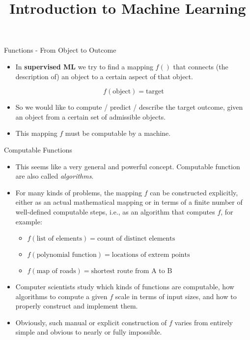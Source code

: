 \documentclass[11pt,compress,t,notes=noshow, xcolor=table]{beamer}
\title{Introduction to Machine Learning}
\institute{\href{https://compstat-lmu.github.io/lecture_i2ml/}{compstat-lmu.github.io/lecture\_i2ml}}
\date{}
\begin{document}












\sloppy

\begin{vbframe}{Functions - From Object to Outcome}

\begin{itemize}
\item In \textbf{supervised ML} we try to find a mapping $f()$ that connects (the description of) an object to a certain aspect of that object.

$$f(\textrm{object}) = \textrm{target}$$

\item So we would like to compute / predict / describe the target outcome, given an object from a certain set of admissible objects.

\item This mapping $f$ must be computable by a machine.
\end{itemize}

\end{vbframe}

\begin{vbframe}{Computable Functions}

\begin{itemize}
\item This seems like a very general and powerful concept. 
  Computable function are also called \emph{algorithms}.
\item For many kinds of problems, the mapping $f$ can be constructed explicitly, either as an actual mathematical mapping or in terms of a finite number of well-defined computable steps, i.e.,  as an algorithm that computes $f$, for example:
\begin{itemize}
\item $f(\textrm{list of elements}) = \textrm{count of distinct elements}$
\item $f(\textrm{polynomial function}) = \textrm{locations of extrem points}$
\item $f(\textrm{map of roads}) = \textrm{shortest route from A to B}$
\end{itemize}
\item Computer scientists study which kinds of functions are computable, how algorithms to compute a given $f$ scale in terms of input sizes, and how to properly construct and implement them.
\item Obviously, such manual or explicit construction of $f$ varies from entirely simple and obvious to nearly or fully impossible.
\end{itemize}
\end{vbframe}
\end{document}
